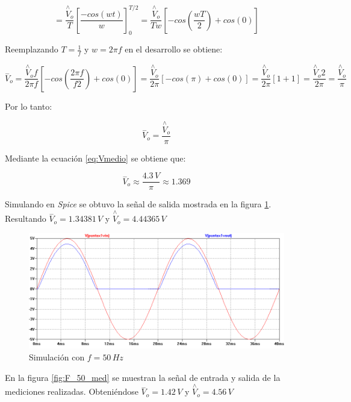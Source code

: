 \documentclass[10pt,spanish,a4paper,openany,notitlepage]{article}
\begin{document}
\[ \displaystyle  = \frac{\overset{\wedge}{V}_{o}}{T} \left[\frac{-cos(wt)}{w}  \right]^{T/2}_0 = \frac{\overset{\wedge}{V}_{o}}{T w} \left[-cos\left(\frac{wT}{2}\right) + cos(0) \right]\]

Reemplazando $T = \frac{1}{f}$ y $w = 2 \pi f$ en el desarrollo se obtiene:

\[ \displaystyle \overset{-}{V}_{o} = \frac{\overset{\wedge}{V}_{o} f}{2 \pi f} \left[-cos\left(\frac{2 \pi f}{f 2}\right) + cos(0) \right] = \frac{\overset{\wedge}{V}_{o}}{2 \pi} \left[-cos(\pi) + cos(0) \right] = \frac{\overset{\wedge}{V}_{o}}{2 \pi} \left[1 + 1 \right] = \frac{\overset{\wedge}{V}_{o} 2}{2 \pi} = \frac{\overset{\wedge}{V}_{o}}{\pi}\]

Por lo tanto:

\begin{equation}
    \overset{-}{V}_{o} = \frac{\overset{\wedge}{V}_{o}}{\pi}
    \label{eq:Vmedio}
\end{equation}

Mediante la ecuación \ref{eq:Vmedio} se obtiene que:

\[ \displaystyle \overset{-}{V}_{o} \approx \frac{4.3\,\unit{V}}{\pi} \approx 1.369 \]


Simulando en \emph{Spice} se obtuvo la señal de salida mostrada en la figura \ref{fig:F_50_sim}. Resultando $\overset{-}{V}_{o} = 1.34381 \,\unit{V} $ y
$\overset{\wedge}{V}_{o} = 4.44365 \,\unit{V} $

\begin{figure}[H]
\centering
\includegraphics[scale=0.65]{simulaciones/F_vo_50.png}
\caption{Simulación con $f = 50\,\unit{Hz}$}
\label{fig:F_50_sim}
\end{figure}

En la figura \ref{fig:F_50_med} se muestran la señal de entrada y salida de la mediciones realizadas. Obteniéndose $\overset{-}{V}_{o} = 1.42 \,\unit{V} $ y $\overset{\wedge}{V}_{o} = 4.56 \,\unit{V} $
\end{document}

